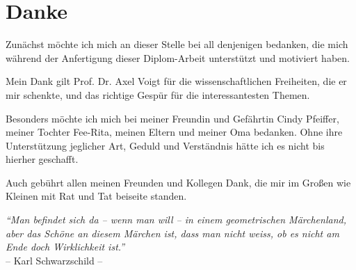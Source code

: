 \chapter*{Danke}
{\setlength{\parindent}{0pt}
Zunächst möchte ich mich an dieser Stelle bei all denjenigen bedanken, die mich während der Anfertigung dieser Diplom-Arbeit unterstützt und motiviert haben.

Mein Dank gilt Prof. Dr. Axel Voigt für die wissenschaftlichen Freiheiten, die er mir schenkte, und das richtige Gespür für die interessantesten Themen.

Besonders möchte ich mich bei meiner Freundin und Gefährtin Cindy Pfeiffer, meiner Tochter Fee-Rita, meinen Eltern und meiner Oma bedanken.
Ohne ihre Unterstützung jeglicher Art, Geduld und Verständnis hätte ich es nicht bis hierher geschafft.

Auch gebührt allen meinen Freunden und Kollegen Dank, die mir im Großen wie Kleinen mit Rat und Tat beiseite standen.
}
\newpage
\thispagestyle{empty}
\vspace*{10cm}
\noindent
\textit{"`Man befindet sich da -- wenn man will -- in einem
geometrischen Märchenland, aber das Schöne an diesem Märchen
ist, dass man nicht weiss, ob es nicht am Ende doch
Wirklichkeit ist."'} \\
-- Karl Schwarzschild --
